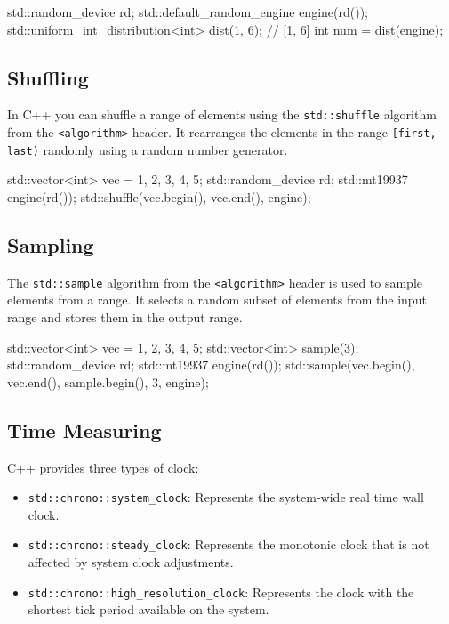 \begin{exampleblock}
    \begin{codeblock}[language=C++]
std::random_device rd;
std::default_random_engine engine(rd());
std::uniform_int_distribution<int> dist(1, 6);  // [1, 6]
int num = dist(engine);
    \end{codeblock}
\end{exampleblock}

\subsection{Shuffling}

In C++ you can shuffle a range of elements using the \texttt{std::shuffle} algorithm from the \texttt{<algorithm>} header. It rearranges the elements in the range \texttt{[first, last)} randomly using a random number generator.

\begin{exampleblock}
    \begin{codeblock}[language=C++]
std::vector<int> vec = {1, 2, 3, 4, 5};
std::random_device rd;
std::mt19937 engine(rd());
std::shuffle(vec.begin(), vec.end(), engine);
    \end{codeblock}
\end{exampleblock}

\subsection{Sampling}

The \texttt{std::sample} algorithm from the \texttt{<algorithm>} header is used to sample elements from a range. It selects a random subset of elements from the input range and stores them in the output range.

\begin{exampleblock}
    \begin{codeblock}[language=C++]
std::vector<int> vec = {1, 2, 3, 4, 5};
std::vector<int> sample(3);
std::random_device rd;
std::mt19937 engine(rd());
std::sample(vec.begin(), vec.end(), sample.begin(), 3, engine);
    \end{codeblock}
\end{exampleblock}

\subsection{Time Measuring}

C++ provides three types of clock:
\begin{itemize}
    \item \texttt{std::chrono::system\_clock}: Represents the system-wide real time wall clock.
    \item \texttt{std::chrono::steady\_clock}: Represents the monotonic clock that is not affected by system clock adjustments.
    \item \texttt{std::chrono::high\_resolution\_clock}: Represents the clock with the shortest tick period available on the system.
\end{itemize}

